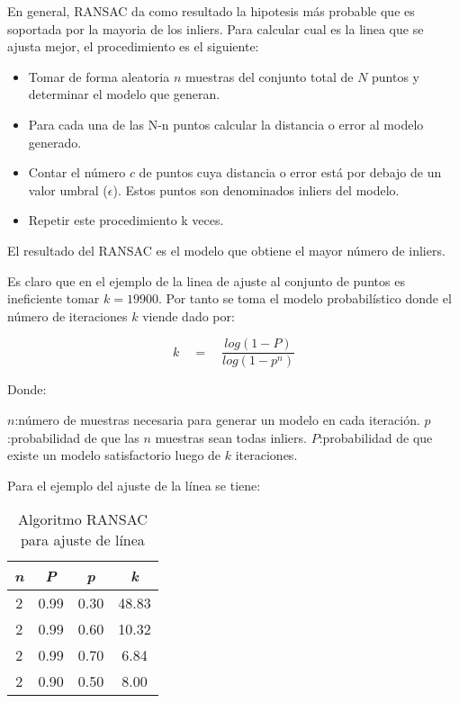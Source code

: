 En general, RANSAC da como resultado la hipotesis más probable que es soportada por la mayoria de los inliers.
Para calcular cual es la linea que se ajusta mejor, el procedimiento es el siguiente:

\begin{itemize}
\item Tomar de forma aleatoria $n$ muestras del conjunto total de $N$ puntos  y determinar el modelo que generan.
\item  Para cada una de las N-n puntos calcular la distancia o error al modelo generado.
\item Contar el número $c$ de puntos cuya distancia o error está por debajo de un valor umbral ($\epsilon$). Estos puntos son denominados inliers del modelo.
\item Repetir este procedimiento k veces.
\end{itemize}

El resultado del RANSAC es el modelo que obtiene el mayor número de inliers.

Es claro que en el ejemplo de la linea de ajuste al conjunto de puntos es ineficiente tomar $k= 19900$. Por tanto se toma el modelo probabilístico donde el número de iteraciones $k$ viende dado por:

\begin{equation}
k\quad =\quad \frac { log(1-P) }{ log(1-{ p }^{ n }) } 
\end{equation}

Donde:

$n$:número de muestras necesaria para generar un modelo en cada iteración.
$p$:probabilidad de que las $n$ muestras sean todas inliers.
$P$:probabilidad de que existe un modelo satisfactorio luego de $k$ iteraciones.

Para el ejemplo del ajuste de la línea se tiene:


\begin{table}[htbp]
	\caption{Algoritmo RANSAC para ajuste de línea}
	\begin{tabular}{|c|c|c|c|}
		\hline
		\textbf{\textit{n}} & \textbf{\textit{P}} & \textbf{\textit{p}} & \textbf{\textit{k}} \\ \hline
		2 & 0.99 & 0.30 & 48.83 \\ \hline
		2 & 0.99 & 0.60 & 10.32 \\ \hline
		2 & 0.99 & 0.70 & 6.84 \\ \hline
		2 & 0.90 & 0.50 & 8.00 \\ \hline
	\end{tabular}
	\label{RansacLinea}
\end{table}


